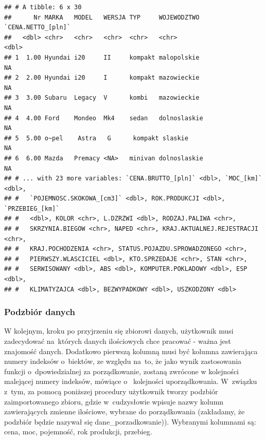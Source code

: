 \documentclass[12pt,a4paper]{report}
\begin{document}
{\begin{verbatim}
## # A tibble: 6 x 30
##      Nr MARKA   MODEL   WERSJA TYP     WOJEWODZTWO  `CENA.NETTO_[pln]`
##   <dbl> <chr>   <chr>   <chr>  <chr>   <chr>                     <dbl>
## 1  1.00 Hyundai i20     II     kompakt malopolskie                  NA
## 2  2.00 Hyundai i20     I      kompakt mazowieckie                  NA
## 3  3.00 Subaru  Legacy  V      kombi   mazowieckie                  NA
## 4  4.00 Ford    Mondeo  Mk4    sedan   dolnoslaskie                 NA
## 5  5.00 o~pel    Astra   G      kompakt slaskie                      NA
## 6  6.00 Mazda   Premacy <NA>   minivan dolnoslaskie                 NA
## # ... with 23 more variables: `CENA.BRUTTO_[pln]` <dbl>, `MOC_[km]` <dbl>,
## #   `POJEMNOSC.SKOKOWA_[cm3]` <dbl>, ROK.PRODUKCJI <dbl>, `PRZEBIEG_[km]`
## #   <dbl>, KOLOR <chr>, L.DZRZWI <dbl>, RODZAJ.PALIWA <chr>,
## #   SKRZYNIA.BIEGOW <chr>, NAPED <chr>, KRAJ.AKTUALNEJ.REJESTRACJI <chr>,
## #   KRAJ.POCHODZENIA <chr>, STATUS.POJAZDU.SPROWADZONEGO <chr>,
## #   PIERWSZY.WLASCICIEL <dbl>, KTO.SPRZEDAJE <chr>, STAN <chr>,
## #   SERWISOWANY <dbl>, ABS <dbl>, KOMPUTER.POKLADOWY <dbl>, ESP <dbl>,
## #   KLIMATYZAJCA <dbl>, BEZWYPADKOWY <dbl>, USZKODZONY <dbl>
\end{verbatim}

\subsubsection{Podzbiór danych}\label{podzbior-danych}

W kolejnym, kroku po przyjrzeniu się zbiorowi danych, użytkownik musi
zadecydować na~których danych ilościowych chce pracować - ważna jest
znajomość danych. Dodatkowo pierwszą kolumną musi być kolumna
zawierająca numery indeksów o~biektów, ze względu na~to, że jako wynik
zastosowania funkcji o~dpowiedzialnej za porządkowanie, zostaną zwrócone
w kolejności malejącej numery indeksów, mówiące o~ kolejności
uporządkowania. W~związku z~tym, za pomocą poniższej procedury
użytkownik tworzy podzbiór zaimportowanego zbioru, gdzie w~cudzysłowie
wpisuje nazwy kolumn zawierających zmienne ilościowe, wybrane do
porządkowania (zakładamy, że podzbiór będzie nazywał się
dane\_porzadkowanie)). Wybranymi kolumnami są: cena, moc, pojemność, rok produkcji,
przebieg.

\begin{Shaded}
\begin{Highlighting}[]
\NormalTok{dane_porzadkowanie<-zbior_danych[}\NormalTok{(}\NormalTok{,}\NormalTok{,}\NormalTok{,}
                                   \NormalTok{,}
                                  \NormalTok{,}\NormalTok{)]}
\end{Highlighting}
\end{Shaded}

}
\end{document}
